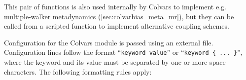 {This pair of functions is also used internally by Colvars to implement e.g.{} multiple-walker metadynamics (\ref{sec:colvarbias_meta_mr}), but they can be called from a scripted function to implement alternative coupling schemes.

\ifdefined{}\fi

}\fi %



Configuration for the Colvars module is passed using an external file\ifdefined{}\fi.
Configuration lines follow the format ``\texttt{keyword value}'' or ``\texttt{keyword \{ ... \}}'', where the keyword and its value must be separated by one or more space characters.
The following formatting rules apply:

